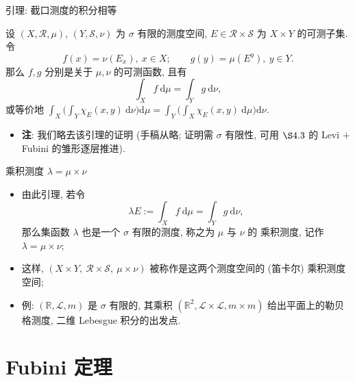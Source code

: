 
\begin{frame}{引理: 截口测度的积分相等}

\begin{lem}
设 $(X, \mathscr{R}, \mu)$, $(Y, \mathscr{S}, \nu)$ 为 \alert{$\sigma$ 有限}的测度空间,
$E \in \mathscr{R} \times \mathscr{S}$ 为 $X \times Y$ 的可测子集. 令
\[
f(x) = \nu(E_x),\ x \in X;
\qquad
g(y) = \mu(E^y),\ y \in Y .
\]
那么 $f, g$ 分别是关于 $\mu, \nu$ 的可测函数, 且有
\[
\int_X f ~ \mathrm{d}\mu = \int_Y g ~ \mathrm{d}\nu ,
\]
或等价地
$\displaystyle \int_X \Big( \int_Y \chi_E(x, y) ~ \mathrm{d}\nu \Big) \mathrm{d}\mu
= \int_Y \Big( \int_X \chi_E(x, y) ~ \mathrm{d}\mu \Big) \mathrm{d}\nu$.
\end{lem}

\pause

\begin{itemize}
\item \textbf{注}: 我们略去该引理的证明 (手稿从略; 证明需 $\sigma$ 有限性, 可用
  $\S 4.3$ 的 Levi $+$ Fubini 的雏形逐层推进).
\end{itemize}

\end{frame}


\begin{frame}{乘积测度 $\lambda = \mu \times \nu$}

\begin{itemize}
\item 由此引理, 若令
\[
\lambda E := \int_X f ~ \mathrm{d}\mu = \int_Y g ~ \mathrm{d}\nu ,
\]
那么集函数 $\lambda$ 也是一个 $\sigma$ 有限的\alert{测度}, 称之为 $\mu$ 与 $\nu$ 的
\alert{乘积测度}, 记作 $\lambda = \mu \times \nu$;
\item 这样, $(X \times Y,\ \mathscr{R} \times \mathscr{S},\ \mu \times \nu)$
  被称作是这两个测度空间的 (笛卡尔) \alert{乘积测度空间};
\graymode
\item 例: $(\mathbb{R}, \mathscr{L}, m)$ 是 $\sigma$ 有限的, 其乘积
  $(\mathbb{R}^2, \mathscr{L} \times \mathscr{L}, m \times m)$ 给出平面上的勒贝格测度, 二维 Lebesgue 积分的出发点.
\normalmode
\end{itemize}

\end{frame}


\section[Fubini]{Fubini 定理}

